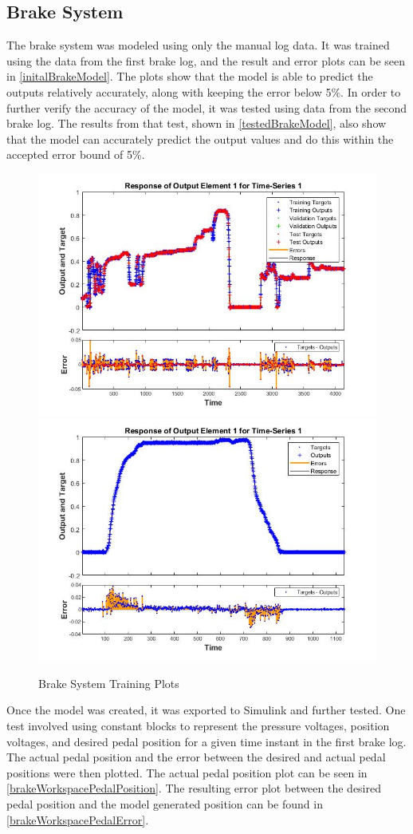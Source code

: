 \documentclass[journal,twoside,web]{ieeecolor}
\begin{document}
\subsection{Brake System}
The brake system was modeled using only the manual log data. It was trained using the data from the first brake log, and the result and error plots can be seen in \autoref{initalBrakeModel}. The plots show that the model is able to predict the outputs relatively accurately, along with keeping the error below 5\%. In order to further verify the accuracy of the model, it was tested using data from the second brake log. The results from that test, shown in \autoref{testedBrakeModel}, also show that the model can accurately predict the output values and do this within the accepted error bound of 5\%.
\begin{figure}[h]
	\centering
		{\includegraphics[width=0.48\linewidth]{figs/img/brake_new_neuralNetworkFig}}
		{\includegraphics[width=0.48\linewidth]{figs/img/brake_new_neuralNetworkFigLog2Test}}
	\caption{Brake System Training Plots}
\end{figure}

Once the model was created, it was exported to Simulink and further tested. One test involved using constant blocks to represent the pressure voltages, position voltages, and desired pedal position for a given time instant in the first brake log. The actual pedal position and the error between the desired and actual pedal positions were then plotted. The actual pedal position plot can be seen in \autoref{brakeWorkspacePedalPosition}. The resulting error plot between the desired pedal position and the model generated position can be found in \autoref{brakeWorkspacePedalError}. 
\end{document}
